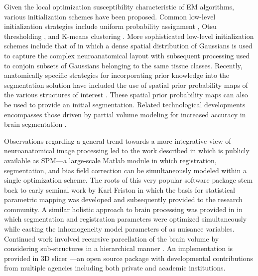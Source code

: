 \documentclass[11pt,english]{article}
\begin{document}
Given the local optimization susceptibility characteristic of EM algorithms, various initialization schemes have been proposed.  Common low-level initialization strategies include uniform
probability assignment \citep{Wells1996}, Otsu thresholding \citep{Zhang2001}, and K-means clustering \citep{Pappas1992}.  More sophisticated low-level initialization schemes include that of \cite{Greenspan2006} in which a dense spatial distribution of Gaussians is used to capture the complex neuroanatomical layout with subsequent processing used to conjoin subsets of Gaussians belonging to the same tissue classes.  Recently, anatomically specific strategies for incorporating prior knowledge  into the segmentation solution have included the use of spatial prior probability maps  of the various structures of interest \citep{Leemput1999a,Marroquin2002,Ashburner2005}.  These spatial prior probability maps can also be used to provide an
initial segmentation.   Related technological developments encompasses those driven by partial volume modeling for increased accuracy in brain segmentation \citep{Ruan2000,Ballester2002,Leemput2003}.

Observations regarding a general trend towards a more integrative view 
of neuroanatomical image processing led to the work described in \cite{Ashburner2005} which is
publicly available as SPM---a large-scale Matlab module in which registration, segmentation, and bias field 
correction can be simultaneously modeled within a single optimization scheme. The roots of this very popular 
software package stem back to early seminal work by Karl Friston in which the basis for statistical parametric mapping was developed \citep{Friston1990} and subsequently provided to the research community. A similar holistic approach
to brain processing was provided in \cite{Pohl2006} in which segmentation
and registration parameters were optimized simultaneously while casting the inhomogeneity model parameters
of \cite{Wells1996} as nuisance variables.  Continued work involved recursive parcellation of the brain volume by considering sub-structures in a hierarchical manner \citep{Pohl2007}.  An implementation is provided in  3D slicer \cite{Pieper2006}---an open source package with developmental contributions from multiple agencies including both private and academic institutions.
\end{document}
